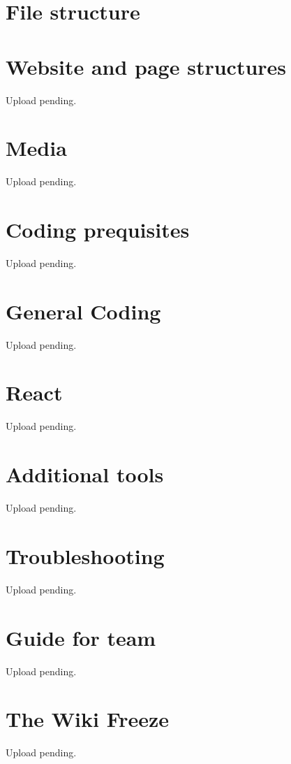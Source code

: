 \documentclass[a4paper, 11pt, twoside]{book}
\begin{document}
\chapter{File structure} \label{ch:structure}

\newpage
%
\chapter{Website and page structures} \label{ch:webstructure}
Upload pending.
%
\newpage
%
\chapter{Media}\label{ch:media}
Upload pending.
%
\newpage
%
\chapter{Coding prequisites} \label{ch:cod}
Upload pending.
%
\newpage
%
\chapter{General Coding}  \label{ch:coding}
Upload pending.
%
\newpage
%
\chapter{React} \label{ch:react}
Upload pending.
%
%
\newpage
%
\chapter{Additional tools} \label{ch:addtools}
Upload pending.
%
\newpage
%
\chapter{Troubleshooting} \label{ch:troubleshooting}
Upload pending.
%
\newpage
%
\chapter{Guide for team} \label{ch:guide}
Upload pending.
%
\newpage
%
\chapter{The Wiki Freeze}  \label{ch:freeze}
Upload pending.
%
\newpage
%
\end{document}
